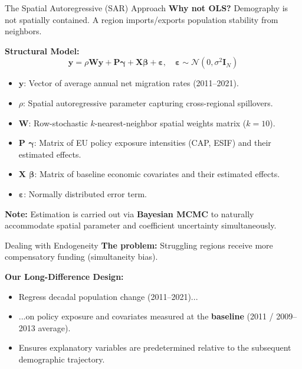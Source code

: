 \documentclass[aspectratio=169]{beamer}
\begin{document}
\begin{frame}{The Spatial Autoregressive (SAR) Approach}
    \textbf{Why not OLS?} Demography is not spatially contained. A region imports/exports population stability from neighbors.
    
    \vspace{0.3cm}
    \textbf{Structural Model:}
    \begin{equation}
    \mathbf{y} = \rho \mathbf{W} \mathbf{y} + \mathbf{P} \boldsymbol{\gamma} + \mathbf{X} \boldsymbol{\beta} + \boldsymbol{\varepsilon}, \quad \boldsymbol{\varepsilon} \sim \mathcal{N}(0, \sigma^2 \mathbf{I}_N)
    \end{equation}

    {\footnotesize
    \begin{itemize}
        \item \textbf{$\mathbf{y}$}: Vector of average annual net migration rates (2011--2021).\pause
        \item \textbf{$\rho$}: Spatial autoregressive parameter capturing cross-regional spillovers.
        \item \textbf{$\mathbf{W}$}: Row-stochastic $k$-nearest-neighbor spatial weights matrix ($k=10$).\pause
        \item \textbf{$\mathbf{P}$  $\boldsymbol{\gamma}$}: Matrix of EU policy exposure intensities (CAP, ESIF) and their estimated effects.\pause
        \item \textbf{$\mathbf{X}$  $\boldsymbol{\beta}$}: Matrix of baseline economic covariates and their estimated effects.\pause
        \item \textbf{$\boldsymbol{\varepsilon}$}: Normally distributed error term.
    \end{itemize}
    
    \vspace{0.3cm}
    \textbf{Note:} Estimation is carried out via \textbf{Bayesian MCMC} to naturally accommodate spatial parameter and coefficient uncertainty simultaneously.
    }
\end{frame}

\begin{frame}{Dealing with Endogeneity}
    \textbf{The problem:} Struggling regions receive more compensatory funding (simultaneity bias).\pause
    \vspace{0.5cm}
    
    \textbf{Our Long-Difference Design:}
    \begin{itemize}
        \item Regress decadal population change (2011--2021)...
        \item ...on policy exposure and covariates measured at the \textbf{baseline} (2011 / 2009--2013 average).
        \item Ensures explanatory variables are predetermined relative to the subsequent demographic trajectory.
    \end{itemize}
\end{frame}
\end{document}
